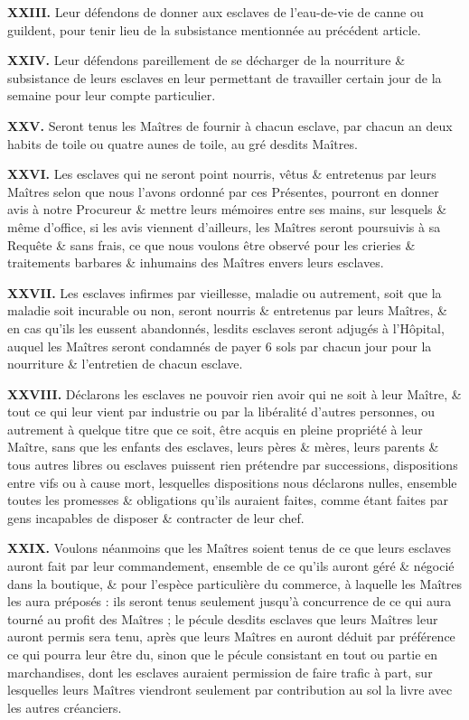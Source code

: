 \documentclass[french,twoside]{book} %
\newcommand{\labelchar}[1]{{\color{rubric}\bf #1}}
\begin{document}
\labelchar{XXIII.} Leur défendons de donner aux esclaves de l’eau-de-vie de canne ou guildent, pour tenir lieu de la subsistance mentionnée au précédent article.\par
\labelchar{XXIV.} Leur défendons pareillement de se décharger de la nourriture \& subsistance de leurs esclaves en leur permettant de travailler certain jour de la semaine pour leur compte particulier.\par
\labelchar{XXV.} Seront tenus les Maîtres de fournir à chacun esclave, par chacun an deux habits de toile ou quatre aunes de toile, au gré desdits Maîtres.\par
\labelchar{XXVI.} Les esclaves qui ne seront point nourris, vêtus \& entretenus par leurs Maîtres selon que nous l’avons ordonné par ces Présentes, pourront en donner avis à notre Procureur \& mettre leurs mémoires entre ses mains, sur lesquels \& même d’office, si les avis viennent d’ailleurs, les Maîtres seront poursuivis à sa Requête \& sans frais, ce que nous voulons être observé pour les crieries \& traitements barbares \& inhumains des Maîtres envers leurs esclaves.\par
\labelchar{XXVII.} Les esclaves infirmes par vieillesse, maladie ou autrement, soit que la maladie soit incurable ou non, seront nourris \& entretenus par leurs Maîtres, \& en cas qu’ils les eussent abandonnés, lesdits esclaves seront adjugés à l’Hôpital, auquel les Maîtres seront condamnés de payer 6 sols par chacun jour pour la nourriture \& l’entretien de chacun esclave.\par
\labelchar{XXVIII.} Déclarons les esclaves ne pouvoir rien avoir qui ne soit à leur Maître, \& tout ce qui leur vient par industrie ou par la libéralité d’autres personnes, ou autrement à quelque titre que ce soit, être acquis en pleine propriété à leur Maître, sans que les enfants des esclaves, leurs pères \& mères, leurs parents \& tous autres libres ou esclaves puissent rien prétendre par successions, dispositions entre vifs ou à cause mort, lesquelles dispositions nous déclarons nulles, ensemble toutes les promesses \& obligations qu’ils auraient faites, comme étant faites par gens incapables de disposer \& contracter de leur chef.\par
\labelchar{XXIX.} Voulons néanmoins que les Maîtres soient tenus de ce que leurs esclaves auront fait par leur commandement, ensemble de ce qu’ils auront géré \& négocié dans la boutique, \& pour l’espèce particulière du commerce, à laquelle les Maîtres les aura préposés : ils seront tenus seulement jusqu’à concurrence de ce qui aura tourné au profit des Maîtres ; le pécule desdits esclaves que leurs Maîtres leur auront permis sera tenu, après que leurs Maîtres en auront déduit par préférence ce qui pourra leur être du, sinon que le pécule consistant en tout ou partie en marchandises, dont les esclaves auraient permission de faire trafic à part, sur lesquelles leurs Maîtres viendront seulement par contribution au sol la livre avec les autres créanciers.\par
\end{document}
